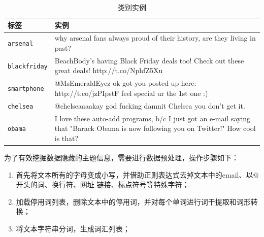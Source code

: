 \begin{table}[H]                                                                    \begin{singlespace}                                                          
    \centering\caption{类别实例}\label{tab:exp}
    \renewcommand{\arraystretch}{1.5} %
    \begin{tabular}{p{2.5cm}p{12.5cm}}\hline                                                        标签
      & 实例 \\ \hline                                                
      \verb|arsenal| & why arsenal fans always proud of their history, are they living in past? \\                                                   
      \verb|blackfriday| &  BeachBody's having Black Friday deals too! Check out these
                           great deals! http://t.co/NphfZ5Xu \\
      \verb|smartphone| & @MsEmeraldEyez ok got you posted up here: http://t.co/jzPIpstF feel special ur the 1st one :)            \\
      \verb|chelsea| &   @chelseaaaakay god fucking damnit Chelsea you don't get it.                                                                                \\
     \verb|obama| &    I love these auto-add programs, b/c I just got an e-mail saying that "Barack Obama is now following you on Twitter!" How cool is that?                                                                                                                                       \\ \hline                                     
    \end{tabular}                                                              
  \end{singlespace}                                                            \end{table}               

为了有效挖掘数据隐藏的主题信息，需要进行数据预处理，操作步骤如下：

\begin{enumerate}
\item
首先将文本所有的字母变成小写，并借助正则表达式去掉文本中的email、以@开头的词、换行符、网址
链接、标点符号等特殊字符；
\item  加载停用词列表，删除文本中的停用词，并对每个单词进行词干提取和词形转换；  
\item 将文本字符串分词，生成词汇列表；
\end{enumerate} 

